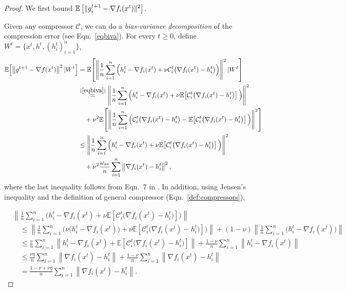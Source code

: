 \documentclass{article} %
\theoremstyle{plain}
\theoremstyle{definition}
\theoremstyle{remark}
\newcommand{\kai}[1]{\todo[inline]{{\textbf{Kai:} \emph{#1}}}}
\newcommand{\sqnorm}[1]{\left\| #1 \right\|^2}
\newcommand{\Exp}[1]{\mathbb{E}\!\left[ #1 \right]}
\newcommand{\oma}{\omega_{\mathrm{av}}}
\begin{document}
\begin{proof}
   We first bound $\mathbb{E}\left[\|g_i^{t+1} - \nabla f_i(x^{t})\|^2\right]$. 

   Given any compressor $\mathcal{C}$, we can do a {\it bias-variance decomposition} of the compression error (see Eqn.~\ref{eqbiva}). 
   For every $t\geq 0$, define $W^t = \{x^t, h^t, (h_i^t)_{i=1}^n\}$,
   \begin{align*}
      \Exp{\sqnorm{g^{t+1}-\nabla f(x^t)} | W^t} &=\Exp{\sqnorm{\frac{1}{n}\sum_{i=1}^n \Big(h_i^{t}-\nabla f_i(x^t) +\nu \mathcal{C}_i^t\big(\nabla f_i(x^t)-h_i^t\big) \Big) } | W^t}\\
      &\stackrel{(\ref{eqbiva})}{=}\sqnorm{\frac{1}{n}\sum_{i=1}^n \Big(h_i^{t}-\nabla f_i(x^t) +\nu \Exp{\mathcal{C}_i^t\big(\nabla f_i(x^t)-h_i^t\big)} \Big)}\\
      &\quad+\nu^2\Exp{\sqnorm{\frac{1}{n}\sum_{i=1}^n \Big( \mathcal{C}_i^t\big(\nabla f_i(x^t)-h_i^t\big)-\Exp{ \mathcal{C}_i^t\big(\nabla f_i(x^t)-h_i^t\big) } \Big) }}\\
      &\leq \sqnorm{\frac{1}{n}\sum_{i=1}^n \Big(h_i^{t}-\nabla f_i(x^t) +\nu \Exp{\mathcal{C}_i^t\big(\nabla f_i(x^t)-h_i^t\big)} \Big)}\\
      &\quad+\nu^2 \frac{\oma}{n}\sum_{i=1}^n \sqnorm{\nabla f_i(x^t)-h_i^t },
   \end{align*}
   where the last inequality follows from Eqn.~7 in \cite{condat2022ef}. In addition, using Jensen's inequality and the definition of general compressor (Eqn.~\ref{def:compressors}), 
 
   \begin{align*}
      &\left\|\frac{1}{n}\sum_{i=1}^n \Big(h_i^{t}-\nabla f_i(x^t) +\nu \Exp{\mathcal{C}_i^t\big(\nabla f_i(x^t)-h_i^t\big)} \Big)\right\|\\
      &\quad \leq \left\|\frac{1}{n}\sum_{i=1}^n \Big(\nu\big(h_i^{t}-\nabla f_i(x^t)\big) +\nu \Exp{\mathcal{C}_i^t\big(\nabla f_i(x^t)-h_i^t\big)} \Big)\right\| + (1-\nu)\left\|\frac{1}{n}\sum_{i=1}^n \big(h_i^{t}-\nabla f_i(x^t)\big)\right\|\\
      &\quad \leq \frac{\nu}{n}\sum_{i=1}^n\left\|h_i^{t}-\nabla f_i(x^t)+ \Exp{\mathcal{C}_i^t\big(\nabla f_i(x^t)-h_i^t\big)}\right\| + \frac{1-\nu}{n}\sum_{i=1}^n \left\|h_i^{t}-\nabla f_i(x^t)\right\|\\
      &\quad \leq  \frac{\nu\eta}{n}\sum_{i=1}^n \left\|\nabla f_i(x^t)-h_i^{t}\right\|+ \frac{1-\nu}{n}\sum_{i=1}^n \left\|\nabla f_i(x^t)-h_i^{t}\right\|\\
      & \quad = \frac{1-\nu+\nu\eta}{n}\sum_{i=1}^n \left\|\nabla f_i(x^t)-h_i^{t}\right\|.
   \end{align*}


\end{proof}
\end{document}
